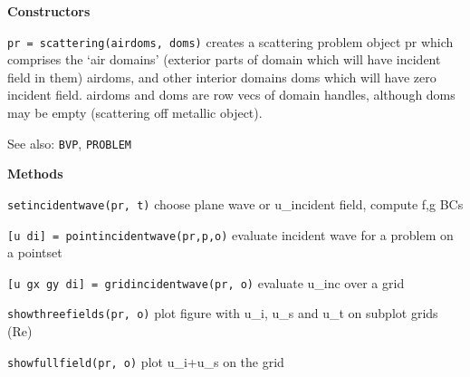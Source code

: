\textbf{Constructors}

{\tt pr = scattering(airdoms, doms)} creates a scattering problem
object pr which comprises the `air domains' (exterior parts of domain which
will have incident field in them) airdoms, and other interior domains doms
which will have zero incident field. airdoms and doms are row vecs of
domain handles, although doms may be empty (scattering off metallic object).

See also: {\tt BVP}, {\tt PROBLEM}

\textbf{Methods}

{\tt setincidentwave(pr, t)} choose plane wave or u\_incident field,
compute f,g BCs

{\tt [u di] = pointincidentwave(pr,p,o)} evaluate incident wave for a
problem on a pointset

{\tt [u gx gy di] = gridincidentwave(pr, o)} evaluate u\_inc over a grid

{\tt showthreefields(pr, o)} plot figure with u\_i, u\_s and u\_t on
subplot grids (Re)

{\tt showfullfield(pr, o)} plot u\_i+u\_s on the grid









 
 
 
















